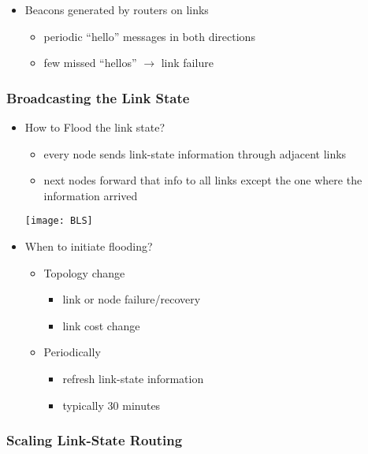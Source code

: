 \documentclass[../resumosRCOM.tex]{subfiles}
\begin{document}
\begin{itemize}
    \item Beacons generated by routers on links
    \begin{itemize}
        \item periodic “hello” messages in both directions
        \item few missed “hellos” $\rightarrow$ link failure
    \end{itemize}
\end{itemize}

\subsubsection{Broadcasting the Link State}

\begin{itemize}
    \item How to Flood the link state?
    \begin{itemize}
        \item every node sends link-state information through adjacent links
        \item next nodes forward that info to all links except the one where the information arrived
    \end{itemize}
    \begin{center}
        \texttt{[image: BLS]}
    \end{center}
    \item When to initiate flooding?
    \begin{itemize}
        \item Topology change
        \begin{itemize}
            \item link or node failure/recovery
            \item link cost change
        \end{itemize}
    \end{itemize}
    \begin{itemize}
        \item Periodically
        \begin{itemize}
            \item refresh link-state information
            \item typically 30 minutes
        \end{itemize}
    \end{itemize}
\end{itemize}

\subsubsection{Scaling Link-State Routing}
\end{document}
